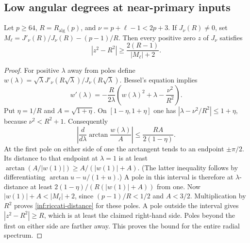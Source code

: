 \subsection{Low angular degrees at near-primary inputs}

\begin{lemma}\label{inf:riccati-gap}
Let $p\ge64$, $R=R_{\mathrm{alg}}(p)$, and
$\nu=p+\ell-1<2p+3$. If $J_\nu(R)\ne0$, set
$M_\ell=J'_\nu(R)/J_\nu(R)-(p-1)/R$. Then every positive zero $z$
of $J_\nu$ satisfies
\begin{equation}\label{inf:riccati-distance}
 |z^2-R^2|\ge\frac{2(R-1)}{|M_\ell|+2}.
\end{equation}
\end{lemma}
\begin{proof}
For positive $\lambda$ away from poles define
$w(\lambda)=\sqrt\lambda J'_\nu(R\sqrt\lambda)/
J_\nu(R\sqrt\lambda)$. Bessel's equation implies
\[
 w'(\lambda)=-\frac R{2\lambda}
             \left(w(\lambda)^2+\lambda-\frac{\nu^2}{R^2}\right).
\]
Put $\eta=1/R$ and $A=\sqrt{1+\eta}$. On
$[1-\eta,1+\eta]$ one has
$|\lambda-\nu^2/R^2|\le1+\eta$, because $\nu^2<R^2+1$.
Consequently
\[
 \left|\frac d{d\lambda}\arctan\frac{w(\lambda)}A\right|
 \le\frac{RA}{2(1-\eta)}.
\]
At the first pole on either side of one the arctangent tends to an
endpoint $\pm\pi/2$. Its distance to that endpoint at $\lambda=1$
is at least $\arctan(A/|w(1)|)\ge A/(|w(1)|+A)$.
(The latter inequality follows by differentiating
$\arctan u-u/(1+u)$.) A pole in this interval is therefore at
$\lambda$-distance at least
$2(1-\eta)/(R(|w(1)|+A))$ from one.
Now $|w(1)|+A<|M_\ell|+2$, since $(p-1)/R<1/2$ and
$A<3/2$. Multiplication by $R^2$ proves
\eqref{inf:riccati-distance} for these poles. A pole outside the
interval gives $|z^2-R^2|\ge R$, which is at least the claimed
right-hand side. Poles beyond the first on either side are farther
away. This proves the bound for the entire radial spectrum.
\end{proof}

